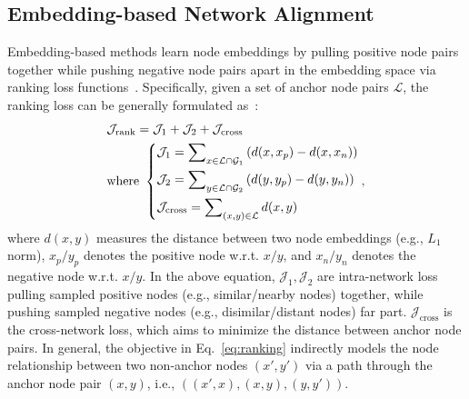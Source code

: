 \subsection{Embedding-based Network Alignment}
Embedding-based methods learn node embeddings by pulling positive node pairs together while pushing negative node pairs apart in the embedding space via ranking loss functions~\cite{ione, crossmna, bright, nextalign}. Specifically, given a set of anchor node pairs $\mathcal{L}$, the ranking loss can be generally formulated as~\cite{bright}:
\begin{equation}\label{eq:ranking}
    \begin{aligned}
    &\mathcal{J}_{\text{rank}}=\mathcal{J}_1+\mathcal{J}_2+\mathcal{J}_{\text{cross}}\\
        &\text{where }\left\{
        \begin{aligned}
            &\mathcal{J}_1=\sum\nolimits_{x\in\mathcal{L}\cap\mathcal{G}_1}\left(d(x,x_p)-d(x,x_n)\right)\\
            &  \mathcal{J}_2=\sum\nolimits_{y\in\mathcal{L}\cap\mathcal{G}_2}\left(d(y,y_p)-d(y,y_n)\right)\\
            &\mathcal{J}_{\text{cross}}=\sum\nolimits_{(x,y)\in\mathcal{L}}d(x,y)
        \end{aligned}
        \right.,
    \end{aligned}
\end{equation}
where $d(x,y)$ measures the distance between two node embeddings (e.g., $L_1$ norm), $x_p/y_p$ denotes the positive node w.r.t. $x/y$, and $x_n/y_n$ denotes the negative node w.r.t. $x/y$.
In the above equation, $\mathcal{J}_1,\mathcal{J}_2$ are intra-network loss pulling sampled positive nodes (e.g., similar/nearby nodes) together, while pushing sampled negative nodes (e.g., disimilar/distant nodes) far part.
$\mathcal{J}_{\text{cross}}$ is the cross-network loss, which aims to minimize the distance between anchor node pairs.
In general, the objective in Eq.~\eqref{eq:ranking} indirectly models the node relationship between two non-anchor nodes $(x',y')$ via a path through the anchor node pair $(x,y)$, i.e., $((x',x),(x,y),(y,y'))$.

